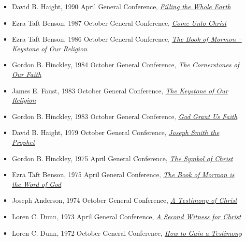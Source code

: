 \documentclass[12pt]{report}
\begin{document}
\begin{itemize}
\item David B. Haight, 1990 April General Conference, \href{https://www.lds.org/general-conference/1990/04/filling-the-whole-earth?lang=eng}{\emph{Filling the Whole Earth}}
\item Ezra Taft Benson, 1987 October General Conference, \href{https://www.lds.org/general-conference/1987/10/come-unto-christ?lang=eng}{\emph{Come Unto Christ}}
\item Ezra Taft Benson, 1986 October General Conference, \href{https://www.lds.org/general-conference/1986/10/the-book-of-mormon-keystone-of-our-religion?lang=eng}{\emph{The Book of Mormon -- Keystone of Our Religion}}
\item Gordon B. Hinckley, 1984 October General Conference, \href{https://www.lds.org/general-conference/1984/10/the-cornerstones-of-our-faith?lang=eng}{\emph{The Cornerstones of Our Faith}}
\item James E. Faust, 1983 October General Conference, \href{https://www.lds.org/general-conference/1983/10/the-keystone-of-our-religion?lang=eng}{\emph{The Keystone of Our Religion}}
\item Gordon B. Hinckley, 1983 October General Conference, \href{https://www.lds.org/general-conference/1983/10/god-grant-us-faith?lang=eng}{\emph{God Grant Us Faith}}
\item David B. Haight, 1979 October General Conference, \href{https://www.lds.org/general-conference/1979/10/joseph-smith-the-prophet?lang=eng}{\emph{Joseph Smith the Prophet}}
\item Gordon B. Hinckley, 1975 April General Conference, \href{https://www.lds.org/general-conference/1975/04/the-symbol-of-christ?lang=eng}{\emph{The Symbol of Christ}}
\item Ezra Taft Benson, 1975 April General Conference, \href{https://www.lds.org/general-conference/1975/04/the-book-of-mormon-is-the-word-of-god?lang=eng}{\emph{The Book of Mormon is the Word of God}}
\item Joseph Anderson, 1974 October General Conference, \href{https://www.lds.org/general-conference/1974/10/a-testimony-of-christ?lang=eng}{\emph{A Testimony of Christ}}
\item Loren C. Dunn, 1973 April General Conference, \href{https://www.lds.org/general-conference/1973/04/a-second-witness-for-christ?lang=eng}{\emph{A Second Witness for Christ}}
\item Loren C. Dunn, 1972 October General Conference, \href{https://www.lds.org/general-conference/1972/10/how-to-gain-a-testimony?lang=eng}{\emph{How to Gain a Testimony}}

\end{itemize}
\end{document}
